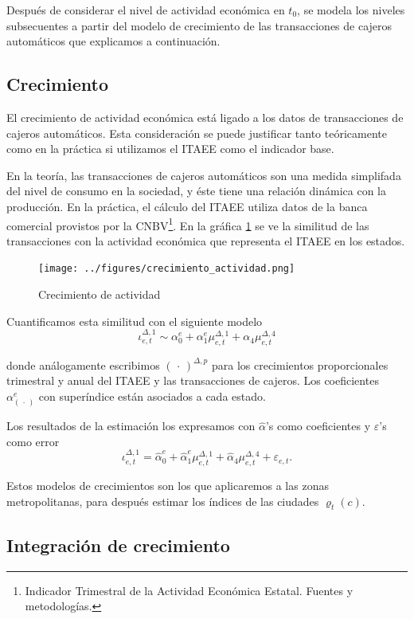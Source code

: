 \documentclass[]{article}
\let\rmarkdownfootnote\footnote%
\def\footnote{\protect\rmarkdownfootnote}
\begin{document}
Después de considerar el nivel de actividad económica en \(t_0\), se
modela los niveles subsecuentes a partir del modelo de crecimiento de
las transacciones de cajeros automáticos que explicamos a continuación.

\subsection{Crecimiento}\label{crecimiento}

El crecimiento de actividad económica está ligado a los datos de
transacciones de cajeros automáticos. Esta consideración se puede
justificar tanto teóricamente como en la práctica si utilizamos el ITAEE
como el indicador base.

En la teoría, las transacciones de cajeros automáticos son una medida
simplifada del nivel de consumo en la sociedad, y éste tiene una
relación dinámica con la producción. En la práctica, el cálculo del
ITAEE utiliza datos de la banca comercial provistos por la
CNBV\footnote{Indicador Trimestral de la Actividad Económica Estatal.
  Fuentes y metodologías.}. En la gráfica \ref{crecimiento} se ve la
similitud de las transacciones con la actividad económica que representa
el ITAEE en los estados.

\begin{figure}[htbp]
\centering
\texttt{[image: ../figures/crecimiento\_actividad.png]}
\caption{Crecimiento de actividad\label{crecimiento}}
\end{figure}

Cuantificamos esta similitud con el siguiente modelo
\[ \iota_{e,t}^{\Delta,1} \sim \alpha_0^e + 
\alpha_1^e\mu_{e,t}^{\Delta,1} + \alpha_4\mu_{e,t}^{\Delta,4}\]

donde análogamente escribimos \((\,\cdot\,)^{\Delta,p}\) para los
crecimientos proporcionales trimestral y anual del ITAEE y las
transacciones de cajeros. Los coeficientes \(\alpha_{(\,\cdot\,)}^e\)
con superíndice están asociados a cada estado.

Los resultados de la estimación los expresamos con \(\hat \alpha\)'s
como coeficientes y \(\varepsilon\)'s como error
\[ \iota_{e,t}^{\Delta,1} = \hat\alpha_0^e + 
\hat\alpha_1^e\mu_{e,t}^{\Delta,1} + \hat\alpha_4\mu_{e,t}^{\Delta,4} + \varepsilon_{e,t}. \]

Estos modelos de crecimientos son los que aplicaremos a las zonas
metropolitanas, para después estimar los índices de las ciudades
\(\varrho_t(c)\).

\subsection{Integración de
crecimiento}\label{integracion-de-crecimiento}
\end{document}
